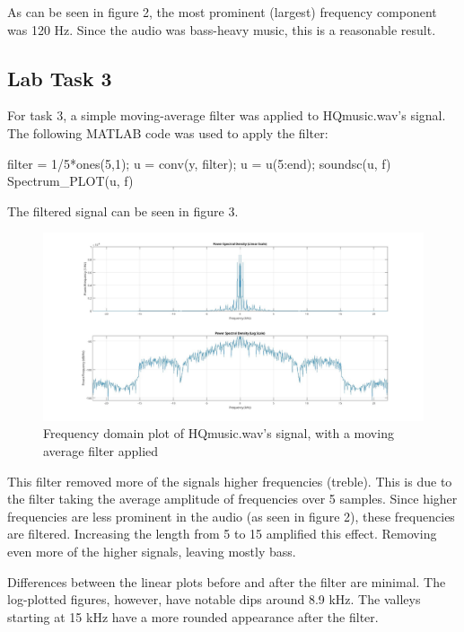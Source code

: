 \documentclass[a4paper,11pt]{article}
\begin{document}
As can be seen in figure 2, the most prominent (largest) frequency component was 120 Hz. Since the audio was bass-heavy music, this is a reasonable result.

\subsection{Lab Task 3}
For task 3, a simple moving-average filter was applied to HQmusic.wav's signal. The following MATLAB code was used to apply the filter:

\begin{ffcode}
filter = 1/5*ones(5,1);
u = conv(y, filter);
u = u(5:end);
soundsc(u, f)
Spectrum_PLOT(u, f)
\end{ffcode}

The filtered signal can be seen in figure 3.
\begin{figure}[H]
    \centering
    \hspace{-60pt}\includegraphics[scale = 0.28]{./images/Task3-filtered.jpg}
    \caption{Frequency domain plot of HQmusic.wav's signal, with a moving average filter applied}
    \label{fig:my_label}
\end{figure}
This filter removed more of the signals higher frequencies (treble). This is due to the filter taking the average amplitude of frequencies over 5 samples. Since higher frequencies are less prominent in the audio (as seen in figure 2), these frequencies are filtered. Increasing the length from 5 to 15 amplified this effect. Removing even more of the higher signals, leaving mostly bass.

Differences between the linear plots before and after the filter are minimal. The log-plotted figures, however, have notable dips around 8.9 kHz. The valleys starting at 15 kHz have a more rounded appearance after the filter.
\end{document}
